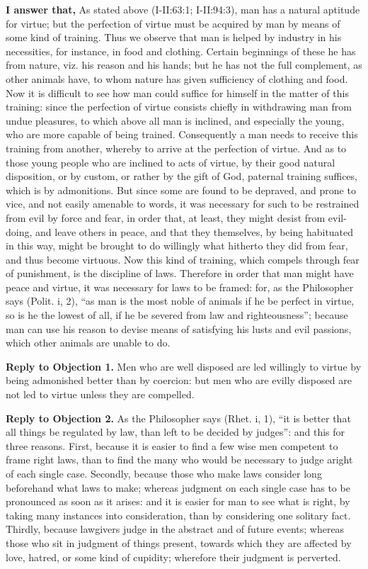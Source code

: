 \textbf{I answer that,} As stated above (I-II:63:1; I-II:94:3), man has a natural aptitude for virtue; but the perfection of virtue must be acquired by man by means of some kind of training. Thus we observe that man is helped by industry in his necessities, for instance, in food and clothing. Certain beginnings of these he has from nature, viz. his reason and his hands; but he has not the full complement, as other animals have, to whom nature has given sufficiency of clothing and food. Now it is difficult to see how man could suffice for himself in the matter of this training: since the perfection of virtue consists chiefly in withdrawing man from undue pleasures, to which above all man is inclined, and especially the young, who are more capable of being trained. Consequently a man needs to receive this training from another, whereby to arrive at the perfection of virtue. And as to those young people who are inclined to acts of virtue, by their good natural disposition, or by custom, or rather by the gift of God, paternal training suffices, which is by admonitions. But since some are found to be depraved, and prone to vice, and not easily amenable to words, it was necessary for such to be restrained from evil by force and fear, in order that, at least, they might desist from evil-doing, and leave others in peace, and that they themselves, by being habituated in this way, might be brought to do willingly what hitherto they did from fear, and thus become virtuous. Now this kind of training, which compels through fear of punishment, is the discipline of laws. Therefore in order that man might have peace and virtue, it was necessary for laws to be framed: for, as the Philosopher says (Polit. i, 2), ``as man is the most noble of animals if he be perfect in virtue, so is he the lowest of all, if he be severed from law and righteousness''; because man can use his reason to devise means of satisfying his lusts and evil passions, which other animals are unable to do.

\textbf{Reply to Objection 1.} Men who are well disposed are led willingly to virtue by being admonished better than by coercion: but men who are evilly disposed are not led to virtue unless they are compelled.

\textbf{Reply to Objection 2.} As the Philosopher says (Rhet. i, 1), ``it is better that all things be regulated by law, than left to be decided by judges'': and this for three reasons. First, because it is easier to find a few wise men competent to frame right laws, than to find the many who would be necessary to judge aright of each single case. Secondly, because those who make laws consider long beforehand what laws to make; whereas judgment on each single case has to be pronounced as soon as it arises: and it is easier for man to see what is right, by taking many instances into consideration, than by considering one solitary fact. Thirdly, because lawgivers judge in the abstract and of future events; whereas those who sit in judgment of things present, towards which they are affected by love, hatred, or some kind of cupidity; wherefore their judgment is perverted.

